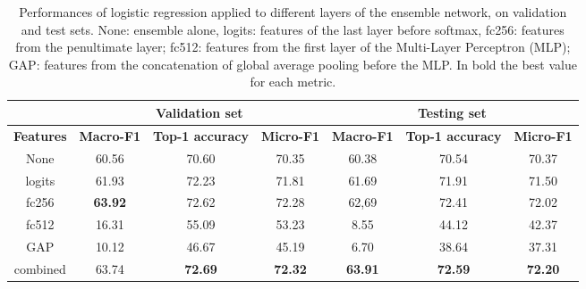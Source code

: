 \begin{table}[htbp]
    \centering
      \caption[Performances of logistic regression applied to different layers of the ensemble network, on validation and test sets]{Performances of logistic regression applied to different layers of the ensemble network, on validation and test sets. None: ensemble alone, logits: features of the last layer before softmax, fc256: features from the penultimate layer; fc512: features from the first layer of the Multi-Layer Perceptron (MLP); GAP: features from the concatenation of global average pooling before the MLP. In bold the best value for each metric.}
      \label{table1.4}
    \begin{tabular}{*{1}{c}|*{3}{c}|*{3}{c}}
    	\toprule
    	\textbf{} & \multicolumn{3}{c}{\textbf{Validation set}} & \multicolumn{3}{c}{\textbf{Testing set}}\\
    	\midrule
    	\textbf{Features} & \textbf{Macro-F1} & \textbf{Top-1 accuracy} & \textbf{Micro-F1} & \textbf{Macro-F1} & \textbf{Top-1 accuracy} & \textbf{Micro-F1}\\
    	\midrule%
    	None & 60.56 & 70.60 & 70.35 & 60.38 & 70.54 & 70.37\\
    	logits & 61.93 & 72.23 & 71.81 & 61.69 & 71.91 & 71.50\\
    	fc256 & \textbf{63.92} & 72.62 & 72.28 & 62,69 & 72.41 & 72.02\\
    	fc512 & 16.31 & 55.09 & 53.23 & 8.55 & 44.12 & 42.37\\
    	GAP & 10.12 & 46.67 & 45.19 & 6.70 & 38.64 & 37.31\\
    	combined & 63.74 & \textbf{72.69} & \textbf{72.32} & \textbf{63.91} & \textbf{72.59} & \textbf{72.20}\\
    	\bottomrule
    \end{tabular}
\end{table}

